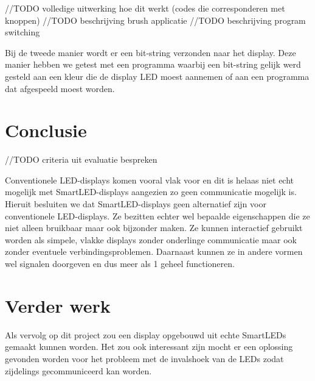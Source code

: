 \documentclass{article}
\begin{document}
//TODO volledige uitwerking hoe dit werkt (codes die corresponderen met knoppen)
//TODO beschrijving brush applicatie
//TODO beschrijving program switching



Bij de tweede manier wordt er een bit-string verzonden naar het display. Deze manier hebben we getest met een programma waarbij een bit-string gelijk werd gesteld aan een kleur die de display LED moest aannemen of aan een programma dat afgespeeld moest worden.


\section{Conclusie}
//TODO criteria uit evaluatie bespreken

Conventionele LED-displays komen vooral vlak voor en dit is helaas niet echt mogelijk met SmartLED-displays aangezien zo geen communicatie mogelijk is. Hieruit besluiten we dat SmartLED-displays geen alternatief zijn voor conventionele LED-displays. Ze bezitten echter wel bepaalde eigenschappen die ze niet alleen bruikbaar maar ook bijzonder maken. Ze kunnen interactief gebruikt worden als simpele, vlakke displays zonder onderlinge communicatie maar ook zonder eventuele verbindingsproblemen. Daarnaast kunnen ze in andere vormen wel signalen doorgeven en dus meer als 1 geheel functioneren.


\section{Verder werk}
Als vervolg op dit project zou een display opgebouwd uit echte SmartLEDs gemaakt kunnen worden. Het zou ook interessant zijn mocht er een oplossing gevonden worden voor het probleem met de invalshoek van de LEDs zodat zijdelings gecommuniceerd kan worden.



\end{document}

